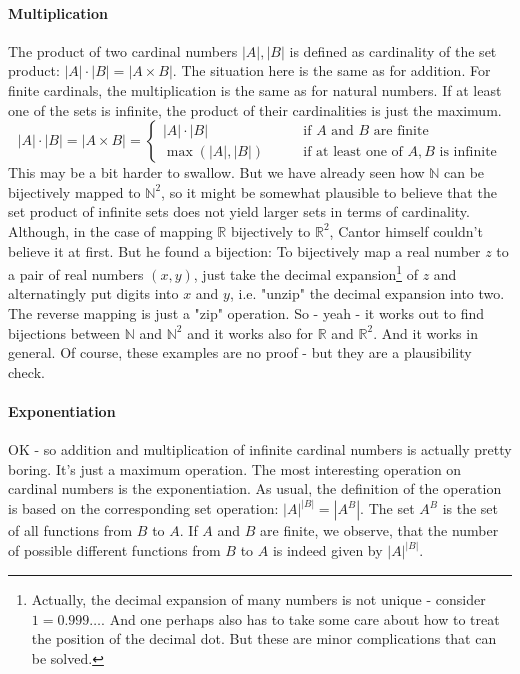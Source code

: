 
\paragraph{Multiplication} The product of two cardinal numbers $|A|,|B|$ is defined as cardinality of the set product: $|A| \cdot |B| = |A \times B|$. The situation here is the same as for addition. For finite cardinals, the multiplication is the same as for natural numbers. If at least one of the sets is infinite, the product of their cardinalities is just the maximum.
\begin{equation}
|A| \cdot |B| = |A \times B| =
\begin{cases}
|A| \cdot |B|    \qquad &\text{if $A$ and $B$ are finite} \\
\max(|A|,|B|)   \qquad &\text{if at least one of $A, B$ is infinite}
\end{cases}
\end{equation}
This may be a bit harder to swallow. But we have already seen how $\mathbb{N}$ can be bijectively mapped to $\mathbb{N}^2$, so it might be somewhat plausible to believe that the set product of infinite sets does not yield larger sets in terms of cardinality. Although, in the case of mapping $\mathbb{R}$ bijectively to $\mathbb{R}^2$, Cantor himself couldn't believe it at first. But he found a bijection: To bijectively map a real number $z$ to a pair of real numbers $(x,y)$, just take the decimal expansion\footnote{Actually, the decimal expansion of many numbers is not unique - consider $1 = 0.999\ldots$. And one perhaps also has to take some care about how to treat the position of the decimal dot. But these are minor complications that can be solved.} of $z$ and alternatingly put digits into $x$ and $y$, i.e. "unzip" the decimal expansion into two. The reverse mapping is just a "zip" operation. So - yeah - it works out to find bijections between $\mathbb{N}$ and $\mathbb{N}^2$ and it works also for  $\mathbb{R}$ and $\mathbb{R}^2$. And it works in general. Of course, these examples are no proof - but they are a plausibility check.



\paragraph{Exponentiation} OK - so addition and multiplication of infinite cardinal numbers is actually pretty boring. It's just a maximum operation. The most interesting operation on cardinal numbers is the exponentiation. As usual, the definition of the operation is based on the corresponding set operation: $|A|^{|B|} = |A^B|$. The set $A^B$ is the set of all functions from $B$ to $A$. If $A$ and $B$ are finite, we observe, that the number of possible different functions from $B$ to $A$ is indeed given by $|A|^{|B|}$.




